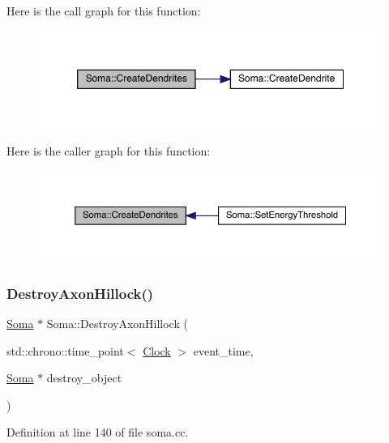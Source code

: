 Here is the call graph for this function\+:
\nopagebreak
\begin{figure}[H]
\begin{center}
\leavevmode
\includegraphics[width=350pt]{class_soma_a68dc02eff2912ad045900ab1879f020e_cgraph}
\end{center}
\end{figure}
Here is the caller graph for this function\+:
\nopagebreak
\begin{figure}[H]
\begin{center}
\leavevmode
\includegraphics[width=350pt]{class_soma_a68dc02eff2912ad045900ab1879f020e_icgraph}
\end{center}
\end{figure}
\mbox{\label{class_soma_af6d6d3e3c94f06682cf05a7a72032a46}} 
\subsubsection{\texorpdfstring{Destroy\+Axon\+Hillock()}{DestroyAxonHillock()}}
{\footnotesize\ttfamily \hyperlink{class_soma}{Soma} $\ast$ Soma\+::\+Destroy\+Axon\+Hillock (\begin{DoxyParamCaption}\item[{std\+::chrono\+::time\+\_\+point$<$ \hyperlink{universe_8h_a0ef8d951d1ca5ab3cfaf7ab4c7a6fd80}{Clock} $>$}]{event\+\_\+time,  }\item[{\hyperlink{class_soma}{Soma} $\ast$}]{destroy\+\_\+object }\end{DoxyParamCaption})}



Definition at line 140 of file soma.\+cc.

